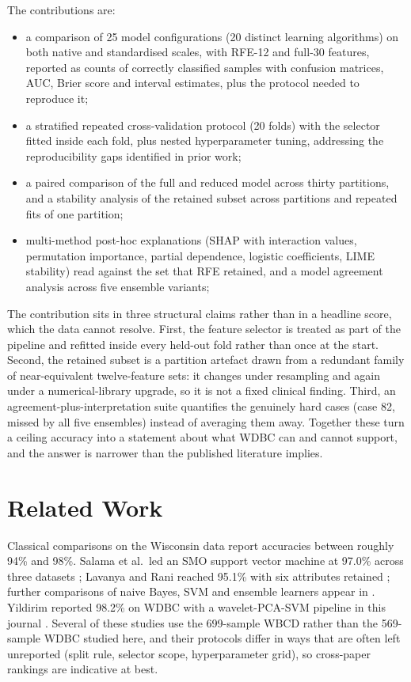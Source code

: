 \documentclass[review,12pt]{elsarticle}
\begin{document}
The contributions are:
\begin{itemize}
\item a comparison of 25 model configurations (20 distinct learning algorithms) on both native and standardised scales, with RFE-12 and full-30 features, reported as counts of correctly classified samples with confusion matrices, AUC, Brier score and interval estimates, plus the protocol needed to reproduce it;
\item a stratified repeated cross-validation protocol (20 folds) with the selector fitted inside each fold, plus nested hyperparameter tuning, addressing the reproducibility gaps identified in prior work;
\item a paired comparison of the full and reduced model across thirty partitions, and a stability analysis of the retained subset across partitions and repeated fits of one partition;
\item multi-method post-hoc explanations (SHAP with interaction values, permutation importance, partial dependence, logistic coefficients, LIME stability) read against the set that RFE retained, and a model agreement analysis across five ensemble variants;
\end{itemize}

The contribution sits in three structural claims rather than in a headline score, which the data cannot resolve. First, the feature selector is treated as part of the pipeline and refitted inside every held-out fold rather than once at the start. Second, the retained subset is a partition artefact drawn from a redundant family of near-equivalent twelve-feature sets: it changes under resampling and again under a numerical-library upgrade, so it is not a fixed clinical finding. Third, an agreement-plus-interpretation suite quantifies the genuinely hard cases (case 82, missed by all five ensembles) instead of averaging them away. Together these turn a ceiling accuracy into a statement about what WDBC can and cannot support, and the answer is narrower than the published literature implies.

\section{Related Work}
\label{sec:related}

Classical comparisons on the Wisconsin data report accuracies between roughly 94\% and 98\%. Salama et al.\ led an SMO support vector machine at 97.0\% across three datasets \cite{salama2012experimental}; Lavanya and Rani reached 95.1\% with six attributes retained \cite{lavanya2011analysis}; further comparisons of naive Bayes, SVM and ensemble learners appear in \cite{hazra2016study,wang2018support,durgalakshmi2020feature,bah2022analysis}. Yildirim reported 98.2\% on WDBC with a wavelet-PCA-SVM pipeline in this journal \cite{yildirim2015hybrid}. Several of these studies use the 699-sample WBCD rather than the 569-sample WDBC studied here, and their protocols differ in ways that are often left unreported (split rule, selector scope, hyperparameter grid), so cross-paper rankings are indicative at best.
\end{document}
